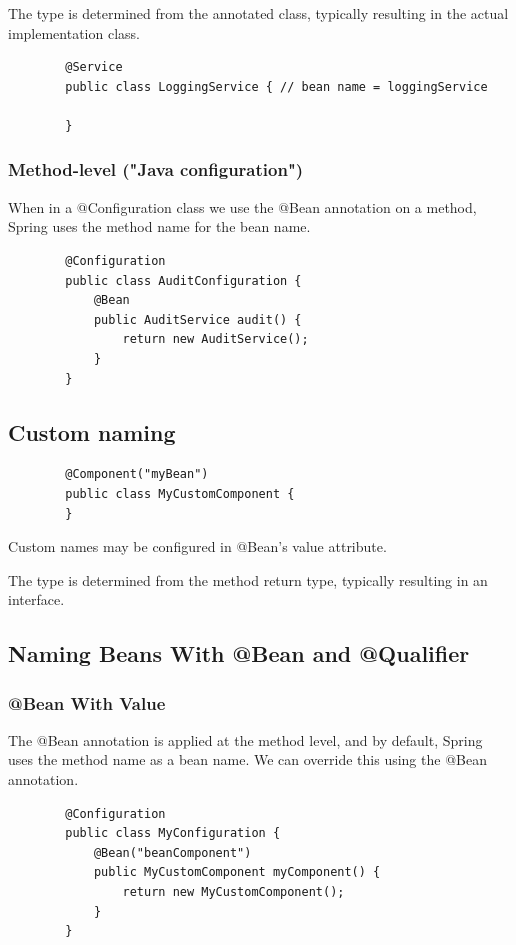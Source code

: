 \documentclass{scrartcl}
\begin{document}
The type is determined from the annotated class, typically resulting in the actual
implementation class.

    \begin{lstlisting}
        @Service
        public class LoggingService { // bean name = loggingService

        }
    \end{lstlisting}

\subsubsection{Method-level ("Java configuration")}
When in a @Configuration class we use the @Bean annotation on a method, Spring uses the method name for the bean name.

    \begin{lstlisting}
        @Configuration
        public class AuditConfiguration {
            @Bean
            public AuditService audit() {
                return new AuditService();
            }
        }
    \end{lstlisting}

\subsection{Custom naming}

    \begin{lstlisting}
        @Component("myBean")
        public class MyCustomComponent {
        }
    \end{lstlisting}

   Custom names may be configured in @Bean's value attribute.

   The type is determined from the method return type, typically resulting in an interface.

\subsection{Naming Beans With @Bean and @Qualifier}
\subsubsection{@Bean With Value}
    The @Bean annotation is applied at the method level, and by default, Spring uses the method name as a bean name. We can override this using the @Bean annotation.

     \begin{lstlisting}
        @Configuration
        public class MyConfiguration {
            @Bean("beanComponent")
            public MyCustomComponent myComponent() {
                return new MyCustomComponent();
            }
        }
    \end{lstlisting}
\end{document}
